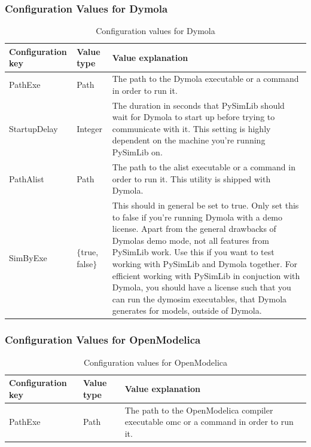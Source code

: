 \subsubsection{Configuration Values for Dymola}
\begin{table}[H]
	\centering
	\begin{tabular}{| l | l | p{10cm} |}
	\hline
		\textbf{Configuration key} & \textbf{Value type} & \textbf{Value explanation} \\ \hline
		
		PathExe & Path & The path to the Dymola executable or a command in order to run it. \\ \hline
		
		StartupDelay & Integer & The duration in seconds that PySimLib should wait for Dymola to start up before trying to communicate with it. This setting is highly dependent on the machine you're running PySimLib on. \\ \hline 
		
		PathAlist & Path & The path to the alist executable or a command in order to run it. This utility is shipped with Dymola. \\ \hline
		
		SimByExe & $\lbrace$true, false$\rbrace$ & This should in general be set to true. Only set this to false if you're running Dymola with a demo license. Apart from the general drawbacks of Dymolas demo mode, not all features from PySimLib work. Use this if you want to test working with PySimLib and Dymola together. For efficient working with PySimLib in conjuction with Dymola, you should have a license such that you can run the \grqq{}dymosim\grqq{} executables, that Dymola generates for models, outside of Dymola. \\ \hline
	\end{tabular}
	\caption{Configuration values for Dymola}
\end{table}




\subsubsection{Configuration Values for OpenModelica}
\begin{table}[h]
	\centering
	\begin{tabular}{| l | l | p{10cm} |}
		\hline
		\textbf{Configuration key} & \textbf{Value type} & \textbf{Value explanation} \\ \hline
		
		PathExe & Path & The path to the OpenModelica compiler executable \grqq{}omc\grqq{} or a command in order to run it. \\ \hline
	\end{tabular}
	\caption{Configuration values for OpenModelica}
\end{table}



